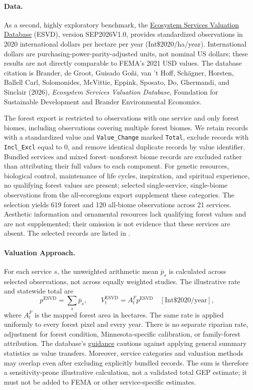 \documentclass[11pt]{article}
\begin{document}
\paragraph{Data.}
As a second, highly exploratory benchmark, the \href{https://www.esvd.net/}{Ecosystem Services Valuation Database} (ESVD), version SEP2026V1.0, provides standardized observations in 2020 international dollars per hectare per year (Int\$2020/ha/year). International dollars are purchasing-power-parity-adjusted units, not nominal US dollars; these results are not directly comparable to FEMA's 2021 USD values. The database citation is Brander, de Groot, Guisado Go\~ni, van 't Hoff, Sch\"agner, Horsten, Ballell Carl, Solomonides, McVittie, Eppink, Sposato, Do, Ghermandi, and Sinclair (2026), \emph{Ecosystem Services Valuation Database}, Foundation for Sustainable Development and Brander Environmental Economics.

The forest export is restricted to observations with one service and only forest biomes, including observations covering multiple forest biomes. We retain records with a standardized value and \texttt{Value\_Change} marked \texttt{Total}, exclude records with \texttt{Incl\_Excl} equal to 0, and remove identical duplicate records by value identifier. Bundled services and mixed forest--nonforest biome records are excluded rather than attributing their full values to each component. For genetic resources, biological control, maintenance of life cycles, inspiration, and spiritual experience, no qualifying forest values are present; selected single-service, single-biome observations from the all-ecoregions export supplement these categories. The selection yields 619 forest and 120 all-biome observations across 21 services. Aesthetic information and ornamental resources lack qualifying forest values and are not supplemented; their omission is not evidence that these services are absent. The selected records are listed in .

\paragraph{Valuation Approach.}
For each service $s$, the unweighted arithmetic mean $\overline{p}_s$ is calculated across selected observations, not across equally weighted studies. The illustrative rate and statewide total are
\[
p^{\mathrm{ESVD}}=\sum_s \overline{p}_s,\qquad
V_t^{\mathrm{ESVD}}=A_t^F p^{\mathrm{ESVD}}
\quad [\mathrm{Int\$2020/year}],
\]
where $A_t^F$ is the mapped forest area in hectares. The same rate is applied uniformly to every forest pixel and every year. There is no separate riparian rate, adjustment for forest condition, Minnesota-specific calibration, or family-forest attribution. The database's \href{https://www.esvd.info/ourdatabase}{guidance} cautions against applying general summary statistics as value transfers. Moreover, service categories and valuation methods may overlap even after excluding explicitly bundled records. The sum is therefore a sensitivity-prone illustrative calculation, not a validated total GEP estimate; it must not be added to FEMA or other service-specific estimates.
\end{document}
